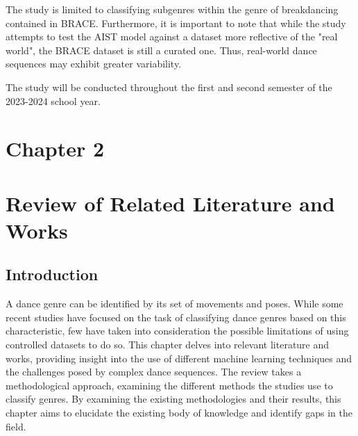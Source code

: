 \documentclass[12pt]{article}
\begin{document}
The study is limited to classifying subgenres within the genre of breakdancing contained in BRACE.
Furthermore, it is important to note that while the study attempts to test the AIST model against a dataset more reflective of the "real world", the BRACE dataset is still a curated one. Thus, real-world dance sequences may exhibit greater variability.
\vspace{5mm}

The study will be conducted throughout the first and second semester of the 2023-2024 school year. 
\newpage
\section*{Chapter 2}
\section{Review of Related Literature and Works}

\subsection{Introduction}
\noindent
\par 

A dance genre can be identified by its set of movements and poses. While some recent studies have focused on the task of classifying dance genres based on this characteristic, few have taken into consideration the possible limitations of using controlled datasets to do so. This chapter delves into relevant literature and works, providing insight into the use of different machine learning techniques and the challenges posed by complex dance sequences. The review takes a methodological approach, examining the different methods the studies use to classify genres. By examining the existing methodologies and their results, this chapter aims to elucidate the existing body of knowledge and identify gaps in the field.



\end{document}
